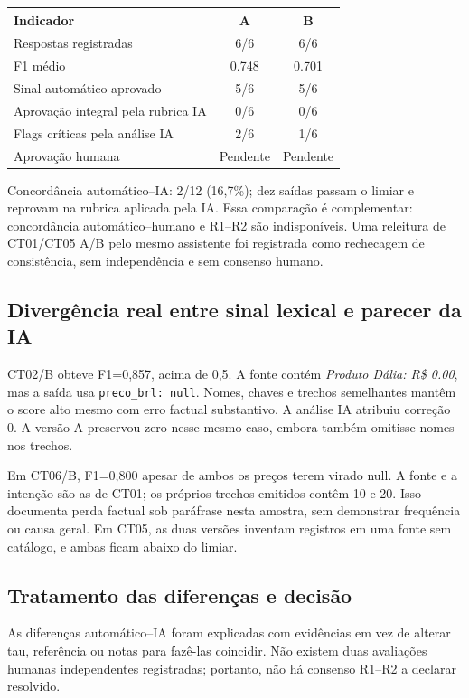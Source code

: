 \documentclass[a4paper,12pt]{article}
\newcommand{\arquivo}[1]{\nolinkurl{#1}}
\begin{document}
\begingroup\small
\begin{tabularx}{\textwidth}{@{}Xcc@{}}\toprule
Indicador & A & B \\\midrule
Respostas registradas & 6/6 & 6/6 \\
F1 médio & 0.748 & 0.701 \\
Sinal automático aprovado & 5/6 & 5/6 \\
Aprovação integral pela rubrica IA & 0/6 & 0/6 \\
Flags críticas pela análise IA & 2/6 & 1/6 \\
Aprovação humana & Pendente & Pendente \\\bottomrule
\end{tabularx}\endgroup

Concordância automático--IA: 2/12 (16,7\%); dez saídas passam o limiar e reprovam na rubrica aplicada pela IA. Essa comparação é complementar: concordância automático--humano e R1--R2 são indisponíveis. Uma releitura de CT01/CT05 A/B pelo mesmo assistente foi registrada como rechecagem de consistência, sem independência e sem consenso humano.

\subsection{Divergência real entre sinal lexical e parecer da IA}
CT02/B obteve F1=0,857, acima de 0,5. A fonte contém \textit{Produto Dália: R\$ 0.00}, mas a saída usa \arquivo{preco_brl: null}. Nomes, chaves e trechos semelhantes mantêm o score alto mesmo com erro factual substantivo. A análise IA atribuiu correção 0. A versão A preservou zero nesse mesmo caso, embora também omitisse nomes nos trechos.

Em CT06/B, F1=0,800 apesar de ambos os preços terem virado null. A fonte e a intenção são as de CT01; os próprios trechos emitidos contêm 10 e 20. Isso documenta perda factual sob paráfrase nesta amostra, sem demonstrar frequência ou causa geral. Em CT05, as duas versões inventam registros em uma fonte sem catálogo, e ambas ficam abaixo do limiar.

\subsection{Tratamento das diferenças e decisão}
As diferenças automático--IA foram explicadas com evidências em vez de alterar tau, referência ou notas para fazê-las coincidir. Não existem duas avaliações humanas independentes registradas; portanto, não há consenso R1--R2 a declarar resolvido.
\end{document}
